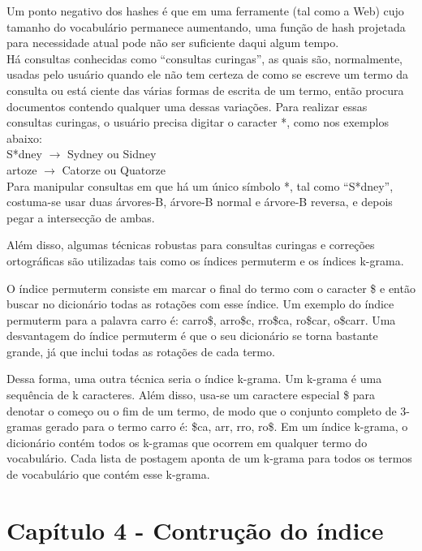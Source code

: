   Um ponto negativo dos hashes é que em uma ferramente (tal como a Web) cujo tamanho do vocabulário permanece aumentando, uma função de hash projetada para necessidade atual pode não ser suficiente daqui algum tempo. \\
  
  Há consultas conhecidas como “consultas curingas”, as quais são, normalmente, usadas pelo usuário quando ele não tem certeza de como se escreve um termo da consulta ou está ciente das várias formas de escrita de um termo, então procura documentos contendo qualquer uma dessas variações. Para realizar essas consultas curingas, o usuário precisa digitar o caracter *, como nos exemplos abaixo: \\
    
\indent S*dney $\rightarrow$ Sydney ou Sidney \\
\indent *artoze $\rightarrow$ Catorze ou Quatorze \\

  Para manipular consultas em que há um único símbolo *, tal como “S*dney”, costuma-se usar duas árvores-B, árvore-B normal e árvore-B reversa, e depois pegar a intersecção de ambas.    

  Além disso, algumas técnicas robustas para consultas curingas e correções ortográficas são utilizadas tais como os índices permuterm e os índices k-grama. 
    
  O índice permuterm consiste em marcar o final do termo com o caracter \$ e então buscar no dicionário todas as rotações com esse índice. Um exemplo do índice permuterm para a palavra carro é:  carro\$, arro\$c, rro\$ca, ro\$car, o\$carr. Uma desvantagem do índice permuterm é que o seu dicionário se torna bastante grande, já que inclui todas as rotações de cada termo. 
    
  Dessa forma, uma outra técnica seria o índice k-grama. Um k-grama é uma sequência de k caracteres. Além disso, usa-se um caractere especial \$ para denotar o começo ou o fim de um termo, de modo que o conjunto completo de 3-gramas gerado para o termo carro é: \$ca, arr, rro, ro\$. Em um índice k-grama, o dicionário contém todos os k-gramas que ocorrem em qualquer termo do  vocabulário. Cada lista de postagem aponta de um k-grama para todos os termos de vocabulário que contém esse k-grama.

\section{Capítulo 4 - Contrução do índice}
\label{sec:construcao_indice}

